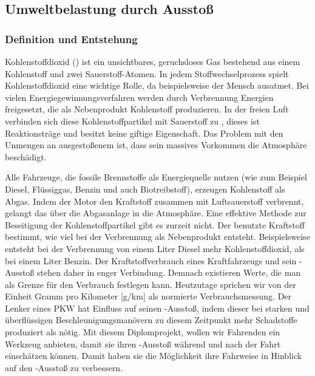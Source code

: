 \subsection{Umweltbelastung durch  Ausstoß}

\subsubsection{Definition und Entstehung}
Kohlenstoffdioxid () ist ein unsichtbares, geruchsloses Gas bestehend aus einem Kohlenstoff und zwei Sauerstoff-Atomen. 
In jedem Stoffwechselprozess spielt Kohlenstoffdioxid eine wichtige Rolle, da beispielsweise der Mensch  ausatmet. 
Bei vielen Energiegewinnungsverfahren werden durch Verbrennung Energien freigesetzt, die als Nebenprodukt Kohlenstoff produzieren. 
In der freien Luft verbinden sich diese Kohlenstoffpartikel mit Sauerstoff zu , dieses ist
Reaktionsträge und besitzt keine giftige Eigenschaft. 
Das Problem mit den Unmengen an ausgestoßenem  ist, dass sein massives Vorkommen die Atmosphäre beschädigt.

Alle Fahrzeuge, die fossile Brennstoffe als Energiequelle nutzen 
(wie zum Beispiel Diesel, Flüssiggas, Benzin und auch Biotreibstoff), erzeugen Kohlenstoff als Abgas. 
Indem der Motor den Kraftstoff zusammen mit Luftsauerstoff verbrennt, gelangt das  über die Abgasanlage in die Atmosphäre. 
Eine effektive Methode zur Beseitigung der Kohlenstoffpartikel gibt es zurzeit nicht. 
Der benutzte Kraftstoff bestimmt, wie viel  bei der Verbrennung als Nebenprodukt entsteht.
Beispielsweise entsteht bei der Verbrennung von einem Liter Diesel mehr Kohlenstoffdioxid, als bei einem Liter Benzin.
Der Kraftstoffverbrauch eines Kraftfahrzeugs und sein -Ausstoß stehen daher in enger Verbindung.
Demnach existieren Werte, die man als Grenze für den Verbrauch festlegen kann. 
Heutzutage sprichen wir von der Einheit Gramm pro Kilometer [g/km] als normierte Verbrauchsmessung.
Der Lenker eines PKW hat Einfluss auf seinen -Ausstoß, indem dieser bei starken und überflüssigen Beschleunigungsmanövern
zu diesem Zeitpunkt mehr Schadstoffe produziert als nötig.
Mit diesem Diplomprojekt, wollen wir Fahrenden ein Werkzeug anbieten, damit sie ihren -Ausstoß während und nach der Fahrt
einschätzen können. Damit haben sie die Möglichkeit ihre Fahrweise in Hinblick auf den -Ausstoß zu verbessern.

\clearpage

